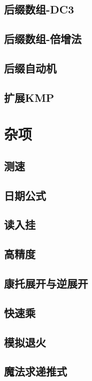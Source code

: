 \documentclass[UTF8]{ctexart}
\begin{document}
\subsection{后缀数组-DC3}

\subsection{后缀数组-倍增法}

\subsection{后缀自动机}

\subsection{扩展KMP}

\section{杂项}
\subsection{测速}

\subsection{日期公式}

\subsection{读入挂}

\subsection{高精度}

\subsection{康托展开与逆展开}

\subsection{快速乘}

\subsection{模拟退火}

\subsection{魔法求递推式}



\end{document}
